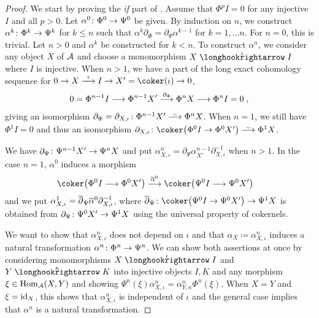 \documentclass[a4paper,parskip=half,numbers=enddot, DIV=12]{scrreprt}
\begin{document}
\begin{proof}
	We start by proving the \emph{if} part of . Assume that $\Phi^pI=0$ for any injective $I$ and all $p>0$. Let $\alpha^0\colon\Phi^0\morphism\Psi^0$ be given. By induction on $n$, we construct $\alpha^k\colon\Phi^k\morphism\Psi^k$ for $k\leq n$ such that $\alpha^k\partial_\Phi=\partial_\Psi\alpha^{k-1}$ for $k=1,\ldots n$. For $ n=0$, this is trivial. Let $ n>0$ and $\alpha^k$ be constructed for $k< n$. To construct $\alpha^ n$, we consider any object $X$ of $\mathcal{A}$ and choose a monomorphism $X\monomorphism[\iota]I$ where $I$ is injective. When $ n>1$, we have a part of the long exact cohomology sequence for $0\morphism X\morphism[\iota]I\morphism X'=\coker(\iota)\morphism 0$,
	\begin{align*}
		0=\Phi^{ n-1}I\morphism\Phi^{ n-1}X'\morphism[\partial_\Phi]\Phi^ n X\morphism\Phi^ n I=0\;,
	\end{align*}
	giving an isomorphism $\partial_\Phi=\partial_{X,\iota}\colon\Phi^{ n-1}X'\isomorphism\Phi^ n X$. When $ n=1$, we still have $\Phi^1I=0$ and thus an isomorphism $\partial_{X,\iota}\colon\coker\big(\Phi^0I\morphism\Phi^0X'\big)\isomorphism\Phi^1X$. 
	
	We have $\partial_\Psi\colon\Psi^{ n-1}X'\morphism\Psi^ n X$ and put $\alpha_{X,\iota}^ n=\partial_\Psi\alpha_{X'}^{n-1}\partial_{X,\iota}^{-1}$ when $ n>1$. In the case $ n=1$, $\alpha^0$ induces a morphism
	\begin{align*}
		\coker\big(\Phi^0I\morphism\Phi^0X'\big)&\morphism[\ov{\alpha}^0]\coker\big(\Psi^0I\morphism\Psi^0X'\big)
	\end{align*}
	and we put $\alpha_{X,\iota}^1=\overline{\partial}_\Psi\overline{\alpha}^0\partial_{X,\iota}^{-1}$, where $\ov{\partial}_\Psi\colon \coker\big(\Psi^0I\morphism\Psi^0X'\big)\morphism\Psi^1X$ is obtained from $\partial_\Psi\colon\Psi^0X'\morphism\Psi^1X$ using the universal property of cokernels.
	
	We want to show that $\alpha_{X,\iota}^ n$ does not depend on $\iota$ and that $\alpha_X\coloneqq \alpha_{X,\iota}^n$ induces a natural transformation $\alpha^n\colon\Phi^n\morphism\Psi^n$. We can show both assertions at once by considering monomorphisms $X\monomorphism[\iota]I$ and $Y\monomorphism[\kappa]K$ into injective objects $I,K$ and any morphism $\xi\in\operatorname{Hom}_{\mathcal{A}}(X,Y)$ and showing $\Psi^n(\xi)\alpha_{X,\iota}^n=\alpha_{Y,\kappa}^n\Phi^n(\xi)$. When $X=Y$ and $\xi=\operatorname{id}_X$, this shows that $\alpha_{X,\iota}^n$ is independent of $\iota$ and the general case implies that $\alpha^n$ is a natural transformation. 
	

\end{proof}
\end{document}
